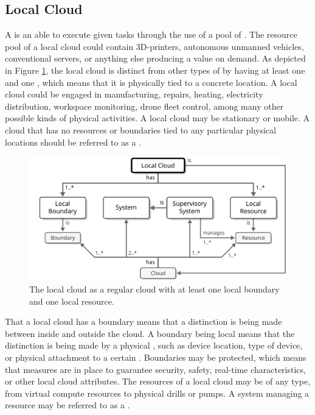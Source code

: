 \subsection{Local Cloud}
\label{sec:concepts:local-cloud}

A  is an   able to execute given tasks through the use of a pool of .
The resource pool of a local cloud could contain 3D-printers, autonomous unmanned vehicles, conventional servers, or anything else producing a value on demand.
As depicted in Figure \ref{fig:local-cloud}, the local cloud is distinct from other types of  by having at least one  and one , which means that it is physically tied to a concrete location.
A local cloud could be engaged in manufacturing, repairs, heating, electricity distribution, workspace monitoring, drone fleet control, among many other possible kinds of physical activities.
A local cloud may be stationary or mobile.
A cloud that has no resources or boundaries tied to any particular physical locations should be referred to as a .

\vfill

\begin{figure}[ht!]
  \centering
  \includegraphics[scale=0.9]{figures/local-cloud}
  \caption{
    The local cloud as a regular cloud with at least one local boundary and one local resource.
  }
  \label{fig:local-cloud}
\end{figure}

That a local cloud has a boundary means that a distinction is being made between  inside and outside the cloud.
A boundary being local means that the distinction is being made by a physical , such as device location, type of device, or physical attachment to a certain .
Boundaries may be protected, which means that measures are in place to guarantee security, safety, real-time characteristics, or other local cloud attributes.
The resources of a local cloud may be of any type, from virtual compute resources to physical drills or pumps.
A system managing a resource may be referred to as a .


